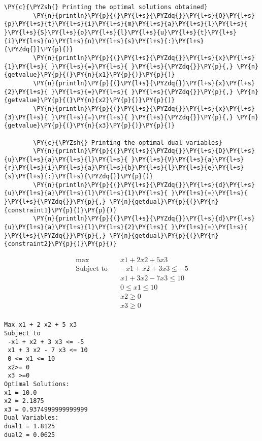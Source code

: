 \begin{Verbatim}[commandchars=\\\{\}]
        \PY{c}{\PYZsh{} Printing the optimal solutions obtained}
        \PY{n}{println}\PY{p}{(}\PY{l+s}{\PYZdq{}}\PY{l+s}{O}\PY{l+s}{p}\PY{l+s}{t}\PY{l+s}{i}\PY{l+s}{m}\PY{l+s}{a}\PY{l+s}{l}\PY{l+s}{ }\PY{l+s}{S}\PY{l+s}{o}\PY{l+s}{l}\PY{l+s}{u}\PY{l+s}{t}\PY{l+s}{i}\PY{l+s}{o}\PY{l+s}{n}\PY{l+s}{s}\PY{l+s}{:}\PY{l+s}{\PYZdq{}}\PY{p}{)}
        \PY{n}{println}\PY{p}{(}\PY{l+s}{\PYZdq{}}\PY{l+s}{x}\PY{l+s}{1}\PY{l+s}{ }\PY{l+s}{=}\PY{l+s}{ }\PY{l+s}{\PYZdq{}}\PY{p}{,} \PY{n}{getvalue}\PY{p}{(}\PY{n}{x1}\PY{p}{)}\PY{p}{)}
        \PY{n}{println}\PY{p}{(}\PY{l+s}{\PYZdq{}}\PY{l+s}{x}\PY{l+s}{2}\PY{l+s}{ }\PY{l+s}{=}\PY{l+s}{ }\PY{l+s}{\PYZdq{}}\PY{p}{,} \PY{n}{getvalue}\PY{p}{(}\PY{n}{x2}\PY{p}{)}\PY{p}{)}
        \PY{n}{println}\PY{p}{(}\PY{l+s}{\PYZdq{}}\PY{l+s}{x}\PY{l+s}{3}\PY{l+s}{ }\PY{l+s}{=}\PY{l+s}{ }\PY{l+s}{\PYZdq{}}\PY{p}{,} \PY{n}{getvalue}\PY{p}{(}\PY{n}{x3}\PY{p}{)}\PY{p}{)}
        
        \PY{c}{\PYZsh{} Printing the optimal dual variables}
        \PY{n}{println}\PY{p}{(}\PY{l+s}{\PYZdq{}}\PY{l+s}{D}\PY{l+s}{u}\PY{l+s}{a}\PY{l+s}{l}\PY{l+s}{ }\PY{l+s}{V}\PY{l+s}{a}\PY{l+s}{r}\PY{l+s}{i}\PY{l+s}{a}\PY{l+s}{b}\PY{l+s}{l}\PY{l+s}{e}\PY{l+s}{s}\PY{l+s}{:}\PY{l+s}{\PYZdq{}}\PY{p}{)}
        \PY{n}{println}\PY{p}{(}\PY{l+s}{\PYZdq{}}\PY{l+s}{d}\PY{l+s}{u}\PY{l+s}{a}\PY{l+s}{l}\PY{l+s}{1}\PY{l+s}{ }\PY{l+s}{=}\PY{l+s}{ }\PY{l+s}{\PYZdq{}}\PY{p}{,} \PY{n}{getdual}\PY{p}{(}\PY{n}{constraint1}\PY{p}{)}\PY{p}{)}
        \PY{n}{println}\PY{p}{(}\PY{l+s}{\PYZdq{}}\PY{l+s}{d}\PY{l+s}{u}\PY{l+s}{a}\PY{l+s}{l}\PY{l+s}{2}\PY{l+s}{ }\PY{l+s}{=}\PY{l+s}{ }\PY{l+s}{\PYZdq{}}\PY{p}{,} \PY{n}{getdual}\PY{p}{(}\PY{n}{constraint2}\PY{p}{)}\PY{p}{)}
\end{Verbatim}


\begin{align*}\max\quad & x1 + 2 x2 + 5 x3\\
\text{Subject to} \quad & -x1 + x2 + 3 x3 \leq -5\\
 & x1 + 3 x2 - 7 x3 \leq 10\\
 & 0 \leq x1 \leq 10\\
 & x2 \geq 0\\
 & x3 \geq 0\\
\end{align*}


    
    \begin{Verbatim}[commandchars=\\\{\}]
Max x1 + 2 x2 + 5 x3
Subject to
 -x1 + x2 + 3 x3 <= -5
 x1 + 3 x2 - 7 x3 <= 10
 0 <= x1 <= 10
 x2>= 0
 x3 >=0
Optimal Solutions:
x1 = 10.0
x2 = 2.1875
x3 = 0.9374999999999999
Dual Variables:
dual1 = 1.8125
dual2 = 0.0625

    \end{Verbatim}

